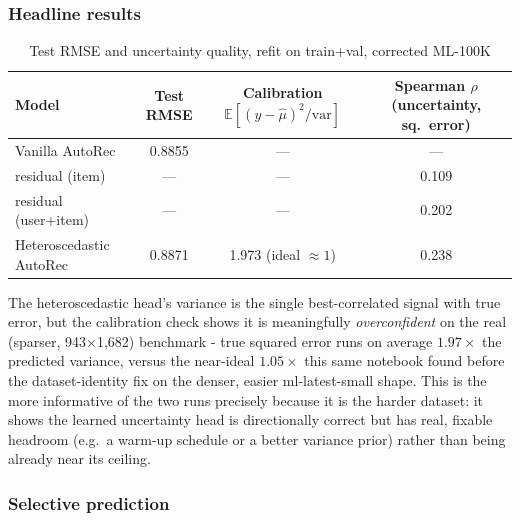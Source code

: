 \subsubsection{Headline results}

\begin{table}[htbp]
\centering
\caption{Test RMSE and uncertainty quality, refit on train+val, corrected ML-100K}
\label{tab:autorec2-headline}
\begin{tabular}{lccc}
\toprule
Model & Test RMSE & Calibration $\mathbb{E}[(y-\hat\mu)^2/\mathrm{var}]$ & Spearman $\rho$ (uncertainty, sq.\ error) \\
\midrule
Vanilla AutoRec         & 0.8855 & --- & --- \\
\quad residual (item)         & --- & --- & 0.109 \\
\quad residual (user+item)    & --- & --- & 0.202 \\
Heteroscedastic AutoRec & 0.8871 & 1.973 (ideal $\approx 1$) & 0.238 \\
\bottomrule
\end{tabular}
\end{table}

The heteroscedastic head's variance is the single best-correlated signal
with true error, but the calibration check shows it is meaningfully
\emph{overconfident} on the real (sparser, 943$\times$1{,}682) benchmark -
true squared error runs on average $1.97\times$ the predicted variance,
versus the near-ideal $1.05\times$ this same notebook found before the
dataset-identity fix on the denser, easier ml-latest-small shape. This is
the more informative of the two runs precisely because it is the harder
dataset: it shows the learned uncertainty head is directionally correct but
has real, fixable headroom (e.g.\ a warm-up schedule or a better variance
prior) rather than being already near its ceiling.

\subsubsection{Selective prediction}

